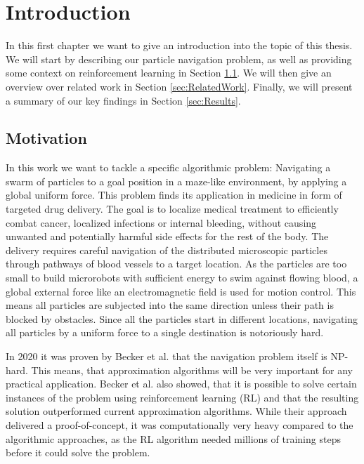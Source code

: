 \chapter{Introduction} \label{chp:Introduction}
In this first chapter we want to give an introduction into the topic of this thesis. We will start by describing our particle navigation problem, as well as providing some context on reinforcement learning in Section \ref{sec:Motivation}. We will then give an overview over related work in Section \ref{sec:RelatedWork}. Finally, we will present a summary of our key findings in Section \ref{sec:Results}.  

\section{Motivation} \label{sec:Motivation}
 In this work we want to tackle a specific algorithmic problem: Navigating a swarm of particles to a goal position in a maze-like environment, by applying a global uniform force. This problem finds its application in medicine in form of targeted drug delivery. The goal is to localize medical treatment to efficiently combat cancer, localized infections or internal bleeding, without causing unwanted and potentially harmful side effects for the rest of the body. The delivery requires careful navigation of the distributed microscopic particles through pathways of blood vessels to a target location. As the particles are too small to build microrobots with sufficient energy to swim against flowing blood, a global external force like an electromagnetic field is used for motion control. This means all particles are subjected into the same direction unless their path is blocked by obstacles. Since all the particles start in different locations, navigating all particles by a uniform force to a single destination is notoriously hard.

In 2020 it was proven by Becker et al. \cite{becker2020} that the navigation problem itself is NP-hard. This means, that approximation algorithms will be very important for any practical application. Becker et al. also showed, that it is possible to solve certain instances of the problem using reinforcement learning (RL) and that the resulting solution outperformed current approximation algorithms. While their approach delivered a proof-of-concept, it was computationally very heavy compared to the algorithmic approaches, as the RL algorithm needed millions of training steps before it could solve the problem. 
 
